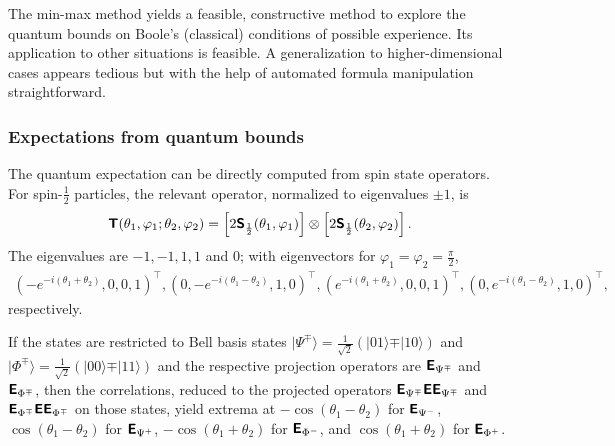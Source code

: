 The min-max method yields a feasible, constructive method to explore the quantum bounds on
Boole's (classical) conditions of possible experience.
Its application to other situations is feasible.
A generalization to higher-dimensional cases appears tedious but with the help of automated
formula manipulation straightforward.


\subsubsection{Expectations from quantum bounds}

The quantum expectation can be directly computed from spin state operators.
For spin-$\frac{1}{2}$ particles, the relevant operator, normalized to eigenvalues  $\pm 1$, is
\begin{equation}
\begin{split}
\textsf{\textbf{T}} (\theta_1 ,\varphi_1;\theta_2 ,\varphi_2)
=
\left[2 \textsf{\textbf{S}}_\frac{1}{2} (\theta_1 ,\varphi_1)\right]
\otimes
\left[2 \textsf{\textbf{S}}_\frac{1}{2} (\theta_2 ,\varphi_2)\right]
.
\end{split}
\label{e-2017-b-whatever-e6a}
\end{equation}
The eigenvalues are $-1,-1,1,1$ and $0$; with eigenvectors for   $\varphi_1=\varphi_2=\frac{\pi}{2}$,
\begin{equation}
\begin{split}
\left( -e^{-i (\theta_1+\theta_2)},0,0,1\right)^\intercal  ,
\left( 0,-e^{-i (\theta_1-\theta_2)},1,0\right)^\intercal  ,
\left( e^{-i (\theta_1+\theta_2)},0,0,1\right)^\intercal   ,
\left( 0,e^{-i (\theta_1-\theta_2)},1,0 \right)^\intercal  ,
\end{split}
\label{e-2017-b-whatever-e6b}
\end{equation}
respectively.

If the states are restricted to Bell basis states
$
\vert \Psi^\mp \rangle = \frac{1}{\sqrt{2}}\left(\vert 0   1 \rangle \mp \vert 1   0 \rangle  \right)
$
and
$\vert \Phi^\mp \rangle = \frac{1}{\sqrt{2}}\left(\vert 0   0 \rangle \mp \vert 1   1 \rangle  \right)
$
and the respective projection operators are
$\textsf{\textbf{E}}_{\Psi^\mp}$ and
$\textsf{\textbf{E}}_{\Phi^\mp}$,
then the correlations, reduced to the projected operators
$\textsf{\textbf{E}}_{\Psi^\mp} \textsf{\textbf{E}} \textsf{\textbf{E}}_{\Psi^\mp} $ and
$\textsf{\textbf{E}}_{\Phi^\mp} \textsf{\textbf{E}} \textsf{\textbf{E}}_{\Phi^\mp} $
on those states,
yield extrema at
$-\cos (\theta_1-\theta_2)$ for $\textsf{\textbf{E}}_{\Psi^-}$,
$\cos (\theta_1-\theta_2)$ for $\textsf{\textbf{E}}_{\Psi^+}$,
$-\cos (\theta_1+\theta_2)$ for $\textsf{\textbf{E}}_{\Phi^-}$, and
$\cos (\theta_1+\theta_2)$ for $\textsf{\textbf{E}}_{\Phi^+}$.



